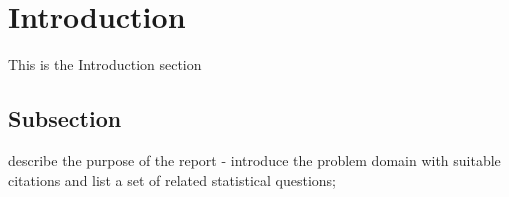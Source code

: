 \section{Introduction}\label{Section label}
This is the Introduction section
\subsection{Subsection}\label{subsection}
describe the purpose of the report - introduce the problem domain with suitable citations and list a set of related statistical questions; 